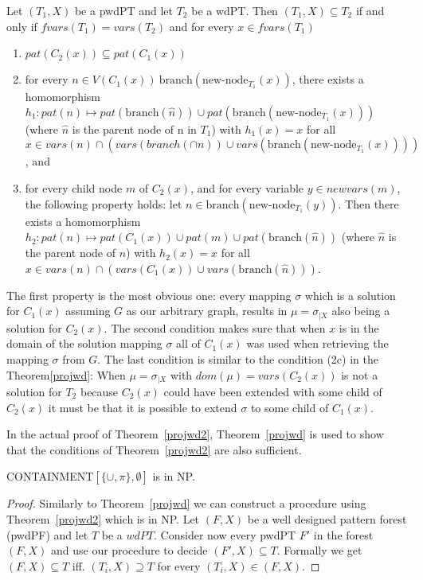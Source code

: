 \begin{theorem}\label{projwd2}
	Let $(T_1,X)$ be a pwdPT and let $T_2$ be a wdPT. Then $(T_1,X) \subseteq
	T_2$ if and only if $fvars(T_1) = vars(T_2)$ and for every $x \in
	fvars(T_1)$
	\begin{enumerate}
		\item $pat(C_2(x)) \subseteq pat(C_1(x))$
		\item for every $n \in V(C_1(x)) \ \mbox{branch} (\mbox{new-node}_{T_1}(x))$, there
			exists a homomorphism $h_1: pat(n) \mapsto pat(\mbox{branch}(\hat{n})) \cup
			pat(\mbox{branch}(\mbox{new-node}_{T_1}(x)))$ (where $\hat{n}$ is the parent node
			of n in $T_1$) with $h_1(x) = x$ for all $x \in vars(n) \cap
			(vars(branch(\cap{n})) \cup vars(\mbox{branch}(\mbox{new-node}_{T_1}(x))))$, and
		\item for every child node $m$ of $C_2(x)$, and for every variable $y
			\in newvars(m)$, the following property holds: let $n \in
			\mbox{branch}(\mbox{new-node}_{T_1}(y))$. Then there exists a homomorphism
			$h_2:pat(n) \mapsto pat(C_1(x)) \cup pat(m) \cup
			pat(\mbox{branch}(\hat{n}))$ (where $\hat{n}$ is the parent node of $n$)
			with $h_2(x) = x$ for all $x \in vars(n) \cap (vars(C_1(x)) \cup
			vars(\mbox{branch}(\hat{n})))$.
	\end{enumerate}
\end{theorem}
\begin{proofidea}
	The first property is the most obvious one: every mapping $\sigma$ which is
	a solution for $C_1(x)$ assuming $G$ as our arbitrary graph, results in $\mu =
	\sigma_{|X}$ also being a solution for $C_2(x)$.
	The second condition makes sure that when $x$ is in the domain of the
	solution mapping $\sigma$ all of $C_1(x)$ was used when retrieving the
	mapping $\sigma$ from $G$.
	The last condition is similar to the condition (2c) in the
	Theorem\ref{projwd}: When $\mu = \sigma_{|X}$ with $dom(\mu) =
	vars(C_2(x))$ is not a solution for $T_2$ because $C_2(x)$ could have been
	extended with some child of $C_2(x)$ it must be that it is possible to
	extend $\sigma$ to some child of $C_1(x)$.
\end{proofidea}

In the actual proof of Theorem~\ref{projwd2}, Theorem~\ref{projwd} is used to show
that the conditions of Theorem~\ref{projwd2} are also sufficient.

\begin{theorem}\label{ccuppiempty}
	CONTAINMENT$[\{\cup,\pi\},\emptyset]$ is in NP.
\end{theorem}
\begin{proof}
	Similarly to Theorem~\ref{projwd} we can construct a procedure using Theorem~\ref{projwd2} 
	which is in NP.
	Let $(F,X)$ be a well designed pattern forest (pwdPF) and let $T$ be a
	$wdPT$. Consider now every pwdPT $F'$ in the forest $(F,X)$ and
	use our procedure to decide $(F',X) \subseteq T$. Formally we get $(F,X) \subseteq T$ iff.
	$(T_i,X) \supseteq T$ for every $(T_i,X) \in (F,X)$.
\end{proof}

